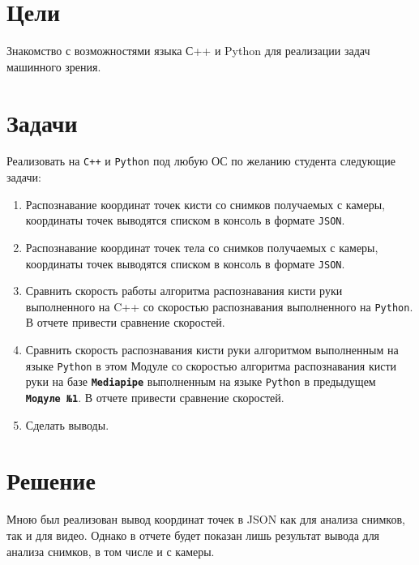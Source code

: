 \documentclass[
  12pt,
  a4paper,
]{article}
\begin{document}
\hypertarget{ux446ux435ux43bux438}{%
\section{Цели}\label{ux446ux435ux43bux438}}

Знакомство с возможностями языка С++ и Python для реализации задач
машинного зрения.

\hypertarget{ux437ux430ux434ux430ux447ux438}{%
\section{Задачи}\label{ux437ux430ux434ux430ux447ux438}}

Реализовать на \texttt{C++} и \texttt{Python} под любую ОС по желанию
студента следующие задачи:

\begin{enumerate}
\def\labelenumi{\arabic{enumi}.}
\item
  Распознавание координат точек кисти со снимков получаемых с камеры,
  координаты точек выводятся списком в консоль в формате \texttt{JSON}.
\item
  Распознавание координат точек тела со снимков получаемых с камеры,
  координаты точек выводятся списком в консоль в формате \texttt{JSON}.
\item
  Сравнить скорость работы алгоритма распознавания кисти руки
  выполненного на C++ со скоростью распознавания выполненного на
  \texttt{Python}. В отчете привести сравнение скоростей.
\item
  Сравнить скорость распознавания кисти руки алгоритмом выполненным на
  языке \texttt{Python} в этом Модуле со скоростью алгоритма
  распознавания кисти руки на базе \textbf{\texttt{Mediapipe}}
  выполненным на языке \texttt{Python} в предыдущем
  \textbf{\texttt{Модуле\ №1}}. В отчете привести сравнение скоростей.
\item
  Сделать выводы.
\end{enumerate}

\hypertarget{ux440ux435ux448ux435ux43dux438ux435}{%
\section{Решение}\label{ux440ux435ux448ux435ux43dux438ux435}}

Мною был реализован вывод координат точек в JSON как для анализа
снимков, так и для видео. Однако в отчете будет показан лишь результат
вывода для анализа снимков, в том числе и с камеры.
\end{document}
